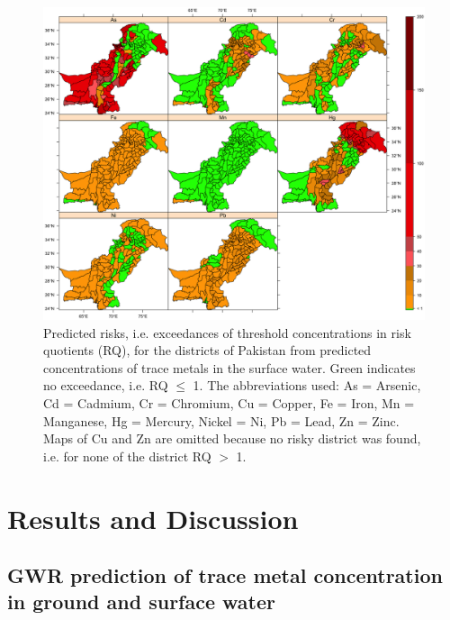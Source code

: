 \begin{figure}[t]
  \centering
  \includegraphics[width=\textwidth]{Figures/Fig_5_5.png}
  \caption{Predicted risks, i.e. exceedances of threshold concentrations in risk quotients (RQ), for the districts of Pakistan from predicted concentrations of trace metals in the surface water. Green indicates no exceedance, i.e. RQ $\leq$ 1. The abbreviations used: As = Arsenic, Cd = Cadmium, Cr = Chromium, Cu = Copper, Fe = Iron, Mn = Manganese, Hg = Mercury, Nickel = Ni, Pb = Lead, Zn = Zinc. Maps of Cu and Zn are omitted because no risky district was found, i.e. for none of the district RQ $>$ 1.}
  \label{Fig_5_5}
\end{figure}

\section{Results and Discussion}
\label{Results and Discussion}

\subsection{GWR prediction of trace metal concentration in ground and surface water}
\label{GWR prediction of trace metal concentration in ground and surface water}

